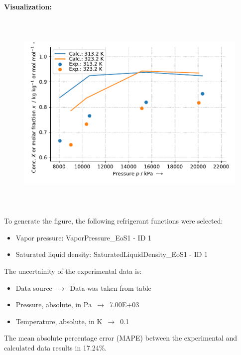 \textbf{Visualization:}
%
\begin{figure}[!htp]
{\noindent\includegraphics[height=10cm, keepaspectratio]{figs/abs/abs_CarbonDioxide_ionic_liquid_[Pyrr4,1][NTf2]_MixingRule_1.pdf}}
\end{figure}
%

To generate the figure, the following refrigerant functions were selected:
\begin{itemize}
\item Vapor pressure: VaporPressure\_EoS1 - ID 1
\item Saturated liquid density: SaturatedLiquidDensity\_EoS1 - ID 1
\end{itemize}

The uncertainity of the experimental data is:
\begin{itemize}
\item Data source $\,\to\,$ Data was taken from table
\item Pressure, absolute, in $\si{\pascal}$ $\,\to\,$ 7.00E+03
\item Temperature, absolute, in $\si{\kelvin}$ $\,\to\,$ 0.1
\end{itemize}

The mean absolute percentage error (MAPE) between the experimental and calculated data results in 17.24\%.
\FloatBarrier
\newpage
